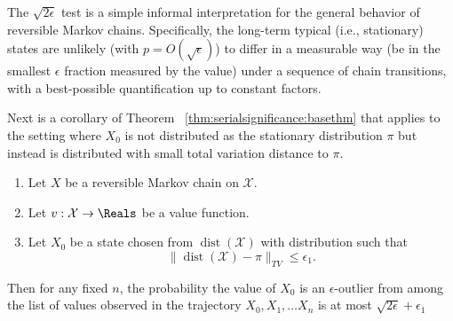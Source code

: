 \documentclass[12pt]{article}
\begin{document}
\begin{remark}
    The \( \sqrt{2\epsilon} \) test is a simple informal interpretation
    for the general behavior of reversible Markov chains.  Specifically,
    the long-term typical (i.e., stationary) states are unlikely (with \(
    p = O(\sqrt{\epsilon}) \)) to differ in a measurable way (be in the
    smallest \( \epsilon \) fraction measured by the value) under a
    sequence of chain transitions, with a best-possible quantification
    up to constant factors.
\end{remark}

Next is a corollary of Theorem~%
\ref{thm:serialsignificance:basethm} that applies to the setting where \(
X_0 \) is not distributed as the stationary distribution \( \pi \) but
instead is distributed with small total variation distance to \( \pi \).

\begin{corollary}
    \begin{enumerate}
        \item
            Let \( X \) be a reversible Markov chain on \( \mathcal{X} \).
        \item
            Let \( v :  \mathcal{X} \to \Reals \) be a value function.
        \item
            Let \( X_0 \) be a state chosen from \(
            \operatorname{dist}
            (\mathcal{X}) \) with distribution such that
            \[
                \|
                \operatorname{dist}
                (\mathcal{X}) - \pi \|_{TV} \le \epsilon_1.
            \]
    \end{enumerate}
    Then for any fixed \( n \), the probability the value of \( X_0 \)
    is an \( \epsilon \)-outlier from among the list of values observed
    in the trajectory \( X_0, X_1, \dots X_n \) is at most \( \sqrt{2\epsilon}
    + \epsilon_1 \)
\end{corollary}
\end{document}
